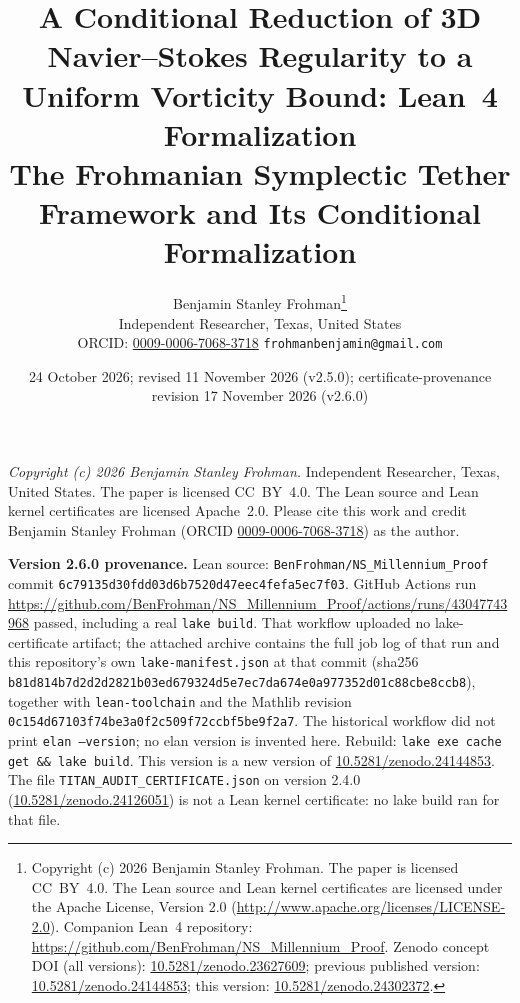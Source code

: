 \documentclass[11pt,a4paper]{article}
\title{A Conditional Reduction of 3D Navier--Stokes Regularity to a Uniform Vorticity Bound: Lean~4 Formalization\\[4pt]
\large The Frohmanian Symplectic Tether Framework and Its Conditional Formalization}
\author{Benjamin Stanley Frohman\thanks{Copyright (c) 2026 Benjamin Stanley Frohman. The paper is licensed CC~BY~4.0. The Lean source and Lean kernel certificates are licensed under the Apache License, Version 2.0 (\url{http://www.apache.org/licenses/LICENSE-2.0}). Companion Lean~4 repository: \url{https://github.com/BenFrohman/NS_Millennium_Proof}. Zenodo concept DOI (all versions): \href{https://doi.org/10.5281/zenodo.23627609}{10.5281/zenodo.23627609}; previous published version: \href{https://doi.org/10.5281/zenodo.24144853}{10.5281/zenodo.24144853}; this version: \href{https://doi.org/10.5281/zenodo.24302372}{10.5281/zenodo.24302372}.}\\Independent Researcher, Texas, United States\\\small ORCID: \href{https://orcid.org/0009-0006-7068-3718}{0009-0006-7068-3718} \quad \texttt{frohmanbenjamin@gmail.com}}
\date{24 October 2026; revised 11 November 2026 (v2.5.0); certificate-provenance revision 17 November 2026 (v2.6.0)}
\theoremstyle{plain}
\theoremstyle{definition}
\theoremstyle{remark}
\begin{document}
\maketitle
\noindent\textit{Copyright (c) 2026 Benjamin Stanley Frohman.} Independent Researcher, Texas, United States. The paper is licensed CC~BY~4.0. The Lean source and Lean kernel certificates are licensed Apache~2.0. Please cite this work and credit Benjamin Stanley Frohman (ORCID \href{https://orcid.org/0009-0006-7068-3718}{0009-0006-7068-3718}) as the author.

\noindent\textbf{Version 2.6.0 provenance.} Lean source: \texttt{BenFrohman/NS\_Millennium\_Proof} commit \texttt{6c79135d30fdd03d6b7520d47eec4fefa5ec7f03}. GitHub Actions run \url{https://github.com/BenFrohman/NS\_Millennium\_Proof/actions/runs/43047743968} passed, including a real \texttt{lake build}. That workflow uploaded no lake-certificate artifact; the attached archive contains the full job log of that run and this repository's own \texttt{lake-manifest.json} at that commit (sha256 \texttt{b81d814b7d2d2d2821b03ed679324d5e7ec7da674e0a977352d01c88cbe8ccb8}), together with \texttt{lean-toolchain} and the Mathlib revision \texttt{0c154d67103f74be3a0f2c509f72ccbf5be9f2a7}. The historical workflow did not print \texttt{elan --version}; no elan version is invented here. Rebuild: \texttt{lake exe cache get \&\& lake build}. This version is a new version of \href{https://doi.org/10.5281/zenodo.24144853}{10.5281/zenodo.24144853}. The file \texttt{TITAN\_AUDIT\_CERTIFICATE.json} on version 2.4.0 (\href{https://doi.org/10.5281/zenodo.24126051}{10.5281/zenodo.24126051}) is not a Lean kernel certificate: no lake build ran for that file.
\end{document}

